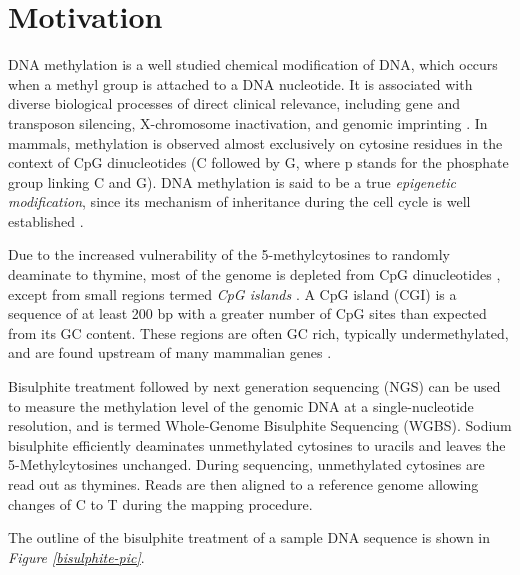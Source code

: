 \section{Motivation} \label{motivation-l}
DNA methylation is a well studied chemical modification of DNA, which occurs when a methyl group is attached to a DNA nucleotide. It is associated with diverse biological processes of direct clinical relevance, including gene and transposon silencing, X-chromosome inactivation, and  genomic imprinting \citep{Li1993, Mohandas1981}. In mammals,  methylation is observed almost exclusively on cytosine residues in the context of CpG dinucleotides (\ie C followed by G, where p stands for the phosphate group linking C and G). DNA methylation is said to be a true \emph{epigenetic modification}, since its mechanism of inheritance during the cell cycle is well established \citep{Law2010}. 

Due to the increased vulnerability of the 5-methylcytosines to randomly deaminate to thymine, most of the genome is depleted from CpG dinucleotides \citep{Scarano1967}, except from small regions termed \emph{CpG islands} \citep{Bird2002}. A CpG island (CGI) is a sequence of at least 200 bp with a greater number of CpG sites than expected from its GC content. These regions are often GC rich, typically undermethylated, and are found upstream of many mammalian genes \citep{Law2010}. 

Bisulphite treatment \citep{Frommer1992} followed by next generation sequencing (NGS) can be used to measure the methylation level of the genomic DNA at a single-nucleotide resolution, and is termed Whole-Genome Bisulphite Sequencing (WGBS). Sodium bisulphite efficiently deaminates unmethylated cytosines to uracils and leaves the 5-Methylcytosines unchanged. During sequencing, unmethylated cytosines are read out as thymines. Reads are then aligned to a reference genome allowing changes of C to T during the mapping procedure. 

The outline of the bisulphite treatment of a sample DNA sequence is shown in \emph{Figure \ref{bisulphite-pic}}.

